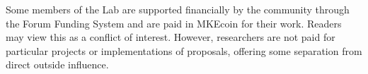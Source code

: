 \documentclass[12pt,english]{mrl}
\theoremstyle{definition}
\numberwithin{equation}{section}
\numberwithin{figure}{section}
\numberwithin{equation}{section}
\numberwithin{equation}{section}
\numberwithin{figure}{section}
\begin{document}
Some members of the Lab are supported financially by the community through the Forum Funding System and are paid in MKEcoin for their work. Readers may view this as a conflict of interest. However, researchers are not paid for particular projects or implementations of proposals, offering some separation from direct outside influence.


\medskip{}



\end{document}
